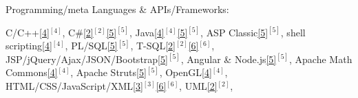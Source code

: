 \begin{cventries}

\vspace{-0.25cm}

  \cventry
    {Programming/meta Languages \& APIs/Frameworks:} %
    {} %
    {} %
    {} %
    {
      \vspace{0.1cm}     
      \begin{cvitems} %
        \item[] {
		\textcolor{rainbowcolor-indigo}{C/C++\ref{4}{$^{[4]}$}},
		\textcolor{rainbowcolor-indigo}{C\#\ref{2}{$^{[2]}$}\ref{5}{$^{[5]}$}},
		\textcolor{rainbowcolor-indigo}{Java\ref{4}{$^{[4]}$}\ref{5}{$^{[5]}$}},
		\textcolor{rainbowcolor-indigo}{ASP Classic\ref{5}{$^{[5]}$}},
		\textcolor{rainbowcolor-indigo}{shell scripting\ref{4}{$^{[4]}$}},
		\textcolor{rainbowcolor-indigo}{PL/SQL\ref{5}{$^{[5]}$}},
		\textcolor{rainbowcolor-indigo}{T-SQL\ref{2}{$^{[2]}$}\ref{6}{$^{[6]}$}},
		\textcolor{rainbowcolor-indigo}{JSP/jQuery/Ajax/JSON/Bootstrap\ref{5}{$^{[5]}$}},
		\textcolor{rainbowcolor-indigo}{Angular %
	    	\& Node.js\ref{5}{$^{[5]}$}},
        \textcolor{rainbowcolor-indigo}{Apache Math Commons\ref{4}{$^{[4]}$}},  
	    \textcolor{rainbowcolor-indigo}{Apache Struts\ref{5}{$^{[5]}$}},
	    \textcolor{rainbowcolor-indigo}{OpenGL\ref{4}{$^{[4]}$}},
	    \textcolor{rainbowcolor-indigo}{HTML/CSS/JavaScript/XML\ref{3}{$^{[3]}$}\ref{6}{$^{[6]}$}},
	    \textcolor{rainbowcolor-indigo}{UML\ref{2}{$^{[2]}$}},
	    }
	  \end{cvitems}
    }  


\end{cventries}
